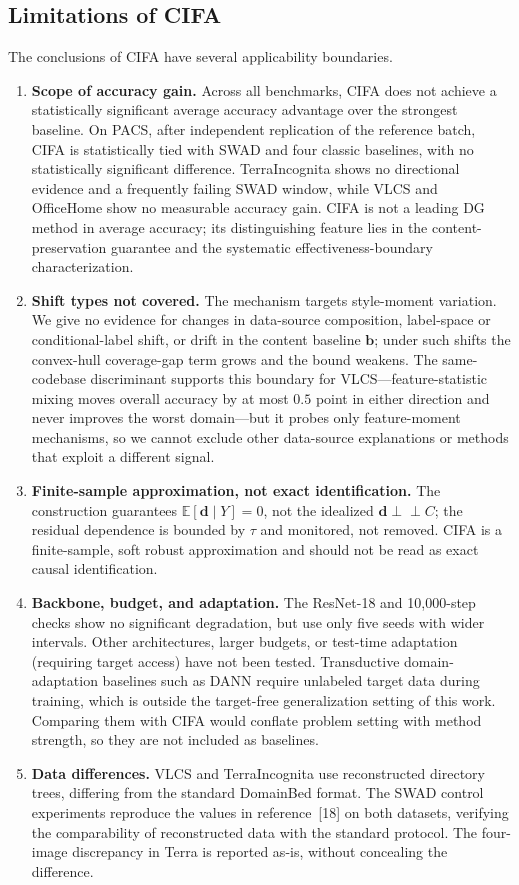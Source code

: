 \documentclass[electronics,article,submit,moreauthors]{Definitions/mdpi}
\newcommand{\add}[1]{\textcolor{addblue}{#1}}
\newcommand{\del}[1]{\textcolor{delred}{\st{#1}}}
\def\add#1{#1}%
\def\del#1{}%
\renewcommand{\add}[1]{#1}
\renewcommand{\del}[1]{}
\begin{document}
\subsection{Limitations of CIFA}

The conclusions of CIFA have several applicability boundaries.
\begin{enumerate}
\item \textbf{Scope of accuracy gain.} Across all benchmarks, CIFA does not achieve a statistically significant average accuracy advantage over the strongest baseline. On PACS, after independent replication of the reference batch, CIFA is statistically tied with SWAD and four classic baselines, with no statistically significant difference. TerraIncognita shows \del{a positive but unconfirmed worst-domain direction}\add{no directional evidence and a frequently failing SWAD window}, while VLCS and OfficeHome show no measurable accuracy gain. CIFA is not a leading DG method in average accuracy; its distinguishing feature lies in the content-preservation guarantee and the systematic effectiveness-boundary characterization.
\item \textbf{Shift types not covered.} The mechanism targets style-moment variation. We give no evidence for changes in data-source composition, label-space or conditional-label shift, or drift in the content baseline $\mathbf{b}$; under such shifts the convex-hull coverage-gap term grows and the bound weakens. The same-codebase discriminant supports this boundary for VLCS---feature-statistic mixing moves overall accuracy by at most $0.5$ point in either direction and never improves the worst domain---but it probes only feature-moment mechanisms, so we cannot exclude other data-source explanations or methods that exploit a different signal.
\item \textbf{Finite-sample approximation, not exact identification.} The construction guarantees $\mathbb{E}[\mathbf{d}\mid Y]=0$, not the idealized $\mathbf{d}\perp\!\!\!\perp C$; the residual dependence is bounded by $\tau$ and monitored, not removed. CIFA is a finite-sample, soft robust approximation and should not be read as exact causal identification.
\item \textbf{Backbone, budget, and adaptation.} The ResNet-18 and 10{,}000-step checks \del{preserve the effect direction but}\add{show no significant degradation, but} use only five seeds with wider intervals. Other architectures, larger budgets, or test-time adaptation (requiring target access) have not been tested. Transductive domain-adaptation baselines such as DANN require unlabeled target data during training, which is outside the target-free generalization setting of this work. Comparing them with CIFA would conflate problem setting with method strength, so they are not included as baselines.
\item \textbf{Data differences.} VLCS and TerraIncognita use reconstructed directory trees, differing from the standard DomainBed format. The SWAD control experiments reproduce the values in reference~[18] on both datasets, verifying the comparability of reconstructed data with the standard protocol. The four-image discrepancy in Terra is reported as-is, without concealing the difference.
\end{enumerate}
\end{document}
